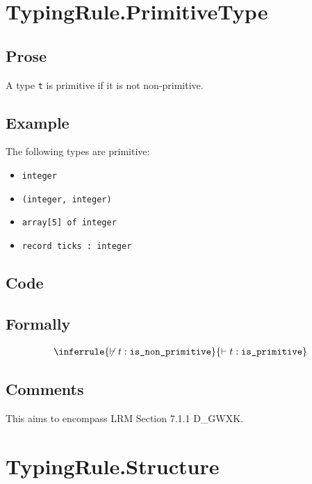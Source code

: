 \documentclass{book}
\newcommand\isnonprimitive[0]{\texttt{is\_non\_primitive}}
\newcommand\isprimitive[0]{\texttt{is\_primitive}}
\begin{document}
\section{TypingRule.PrimitiveType}

    \subsection{Prose} 
    A type \texttt{t} is primitive if it is not non-primitive.

    \subsection{Example}
The following types are primitive:
\begin{itemize}
\item \texttt{integer}
\item \texttt{(integer, integer)}
\item \texttt{array[5] of integer}
\item \texttt{record {ticks : integer}}
\end{itemize}

    \subsection{Code}

\begin{formal}
  \subsection{Formally}
\[
\begin{array}{c}
\inferrule{\not\entails t : \isnonprimitive}{\entails t : \isprimitive}
\end{array}
\]
\end{formal}

    \subsection{Comments}
    This aims to encompass LRM Section 7.1.1 D\_GWXK.

\section{TypingRule.Structure}
\end{document}
